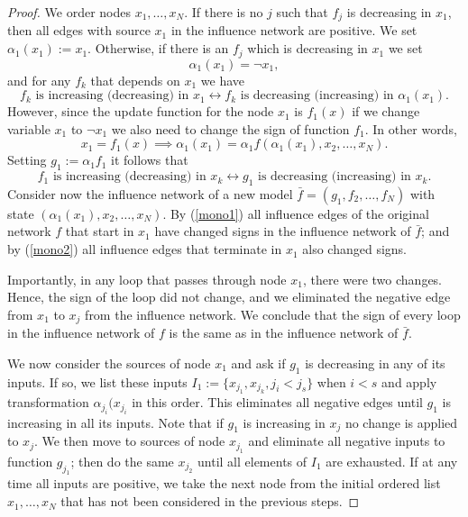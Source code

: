 \documentclass[10pt,letterpaper]{article}
\begin{document}
\begin{proof}
We order nodes $x_1, \ldots, x_N$. If there is no $j$ such that $f_j$ is decreasing in $x_1$, then all edges with source $x_1$ in the influence network are positive. We set $\alpha_1(x_1) :=x_1$. Otherwise, if there is an $f_j$ which is decreasing in $x_1$ we set 
\[ \alpha_1(x_1) = \neg x_1 , \]
and for any $f_k$ that depends on $x_1$ we have 
\begin{equation} \label{mono1}
f_k \mbox{ is increasing (decreasing) in } x_1 \leftrightarrow f_k \mbox{ is decreasing (increasing) in } \alpha_1(x_1) . 
\end{equation}
However, since the update function for the node $x_1$ is $f_1(x)$ if we change variable $x_1$ to $\neg x_1$ we also need to change the sign of function $f_1$. In other words,
 \[ x_1 = f_1(x) \implies \alpha_1(x_1) = \alpha_1 f( \alpha_1(x_1),x_2, \ldots, x_N).\] 
Setting $g_1 := \alpha_1 f_1$ it follows that 
\begin{equation} \label{mono2}
f_1 \mbox{ is increasing (decreasing) in } x_k \leftrightarrow g_1 \mbox{ is decreasing (increasing) in }x_k . \end{equation}
Consider now the influence network of a new model
$\bar f=(g_1, f_2, \ldots, f_N)$ with state $(\alpha_1(x_1), x_2, \ldots, x_N)$. 
By (\ref{mono1}) all influence edges of the original network $f$ that start in $x_1$ have changed signs in the influence network of $\bar f$; and by (\ref{mono2}) all influence edges that terminate in $x_1$ also changed signs. 

Importantly, in any loop that passes through node $x_1$, there were two changes. Hence, the sign of the loop did not change, and we eliminated the negative edge from $x_1$ to $x_j$ from the influence network. We conclude that the sign of every loop in the influence network of $f$ is the same as in the influence network of $\bar f$. 

We now consider the sources of node $x_1$ and ask if $g_1$ is decreasing in any of its inputs. If so, we list these inputs $I_1:=\{ x_{j_1}, x_{j_k}, j_i< j_s\}$ when $i<s$ and apply transformation $\alpha_{j_i}(x_{j_i}$ in this order. This eliminates all negative edges until $g_1$ is increasing in all its inputs. Note that if $g_1$ is increasing in $x_j$ no change is applied to $x_j$. We then move to sources of node $x_{j_1}$ and eliminate all negative inputs to function $g_{j_1}$; then do the same $x_{j_2}$ until all elements of $I_1$ are exhausted. If at any time all inputs are positive, we take the next node from the initial ordered list $x_1, \ldots, x_N$ that has not been considered in the previous steps.


\end{proof}
\end{document}
